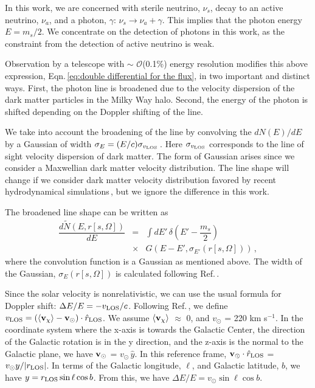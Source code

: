 \documentclass[aps,prd,10pt,twocolumn,superscriptaddress,showpacs]{revtex4-1}
\begin{document}
In this work, we are concerned with sterile neutrino, $\nu_s$, decay to an active neutrino, $\nu_a$, and a photon, $\gamma$: $\nu_s \rightarrow \nu_a + \gamma$.  This implies that the photon energy $E = m_s/2$.  We concentrate on the detection of photons in this work, as the constraint from the detection of active neutrino is weak.

Observation by a telescope with $\sim$ $\mathcal{O}$(0.1\%) energy resolution modifies this above expression, Eqn.\,\ref{eq:double differential for the flux}, in two important and distinct ways.  First, the photon line is broadened due to the velocity dispersion of the dark matter particles in the Milky Way halo.  Second, the energy of the photon is shifted depending on the Doppler shifting of the line.  

We take into account the broadening of the line by convolving the $dN(E)/dE$ by a Gaussian of width $\sigma_E = (E/c) \sigma_{v_{\rm LOS}}$\,\cite{speckhard2016}.  Here $\sigma_{v_{\rm LOS}}$ corresponds to the line of sight velocity dispersion of dark matter.  The form of Gaussian arises since we consider a Maxwellian dark matter velocity distribution.  The line shape will change if we consider dark matter velocity distribution favored by recent hydrodynamical simulations\,\cite{Bozorgnia:2016ogo,Sloane:2016kyi,Kelso:2016qqj}, but we ignore the difference in this work.  

The broadened line shape can be written as 
\begin{eqnarray}
\dfrac{d \tilde{N} (E, r[s, \Omega])}{dE} &=& \int dE' \, \delta \left(E' - \dfrac{m_s}{2} \right) \nonumber\\
&\times& G(E - E', \sigma_{E'} (r[s, \Omega])) \, ,
\label{eq:formula for modified dNdE}
\end{eqnarray}
where the convolution function is a Gaussian as mentioned above.  The width of the Gaussian, $\sigma_E (r[s, \Omega])$ is calculated following Ref.\,\cite{speckhard2016}.

Since the solar velocity is nonrelativistic, we can use the usual formula for Doppler shift: $\Delta
E/E = - v_{\rm LOS}/c$.  Following Ref.\,\cite{speckhard2016}, we define $v_{\rm LOS} = (\langle
{\bf v}_\chi \rangle - {\bf v}_\odot) \cdot \hat{r}_{\rm LOS}$.  We assume $\langle {\bf v}_\chi
\rangle$ $\approx$ 0, and $v_\odot$ = 220 km s$^{-1}$.  In the coordinate system where the x-axis is
towards the Galactic Center, the direction of the Galactic rotation is in the y direction, and the
z-axis is the normal to the Galactic plane, we have ${\bf v}_\odot$ = $v_\odot \, \hat{y}$.  In this
reference frame, ${\bf v}_\odot \cdot \hat{r}_{\rm LOS}$ = $v_\odot y / |r_{\rm LOS}|$.  In terms of the Galactic longitude, $\ell$, and Galactic latitude, $b$, we have $y = r_{\rm LOS} \, {\rm sin} \, \ell \, {\rm cos} \, b$.  From this, we have $\Delta E/E = v_\odot \sin \ell\cos b$.
\end{document}
